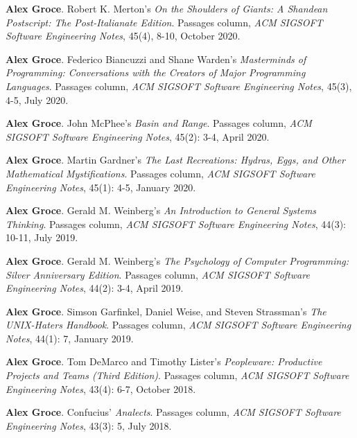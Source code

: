 \documentclass[ComputerScience]{vita}
\begin{document}
\begin{vita}
\begin{Columns, Book Reviews, and Magazine Articles}
\item {\bf Alex Groce}. 
\newblock Robert K. Merton's \emph{On the Shoulders of Giants: A
  Shandean Postscript: The Post-Italianate Edition}. 
\newblock Passages column, \emph{ACM SIGSOFT Software Engineering 
  Notes}, 45(4), 8-10, October 2020.

\item {\bf Alex Groce}. 
\newblock Federico Biancuzzi and Shane Warden's \emph{Masterminds of 
  Programming: Conversations with the Creators of Major Programming Languages}. 
\newblock Passages column, \emph{ACM SIGSOFT Software Engineering 
  Notes}, 45(3), 4-5, July 2020.
  
\item {\bf Alex Groce}. 
\newblock John McPhee's \emph{Basin and Range}. 
\newblock Passages column, \emph{ACM SIGSOFT Software Engineering 
  Notes}, 45(2): 3-4, April 2020.
  
\item {\bf Alex Groce}. 
\newblock Martin Gardner's \emph{The Last Recreations: Hydras, Eggs, and Other Mathematical Mystifications}. 
\newblock Passages column, \emph{ACM SIGSOFT Software Engineering 
  Notes}, 45(1): 4-5, January 2020.
  
\item {\bf Alex Groce}. 
\newblock Gerald M. Weinberg's \emph{An Introduction to General
  Systems Thinking}.
\newblock Passages column, \emph{ACM SIGSOFT Software Engineering
  Notes}, 44(3): 10-11, July 2019.
  
\item {\bf Alex Groce}. 
\newblock Gerald M. Weinberg's \emph{The Psychology of Computer
  Programming: Silver Anniversary Edition}.
\newblock Passages column, \emph{ACM SIGSOFT Software Engineering
  Notes}, 44(2): 3-4, April 2019.
  
\item {\bf Alex Groce}.
\newblock Simson Garfinkel, Daniel Weise, and Steven Strassman's \emph{The UNIX-Haters Handbook}. 
\newblock Passages column, \emph{ACM SIGSOFT Software Engineering 
  Notes}, 44(1): 7, January 2019.

\item {\bf Alex Groce}. 
\newblock Tom DeMarco and Timothy Lister's \emph{Peopleware: Productive Projects and Teams (Third Edition)}. 
\newblock Passages column, \emph{ACM SIGSOFT Software Engineering 
  Notes}, 43(4): 6-7, October 2018.

\item {\bf Alex Groce}. 
\newblock Confucius' \emph{Analects}. 
\newblock Passages column, \emph{ACM SIGSOFT Software Engineering 
  Notes}, 43(3): 5, July 2018.


\end{Columns, Book Reviews, and Magazine Articles}
\end{vita}
\end{document}
